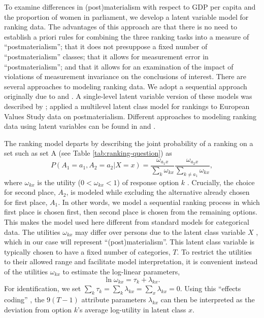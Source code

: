 \documentclass[letterpaper,12pt]{article}
\begin{document}
To examine differences in (post)materialism with respect to GDP per capita and the proportion of women in parliament, we develop a latent variable model for ranking data. The advantages of this approach are that there is no need to establish a priori rules for combining the three ranking tasks into a measure of ``postmaterialism''; that it does not presuppose a fixed number of ``postmaterialism'' classes; that it allows for measurement error in ``postmaterialism''; and that it allows for an examination of the impact of violations of measurement invariance on the conclusions of interest. 
There are several approaches to modeling ranking data. We adopt a sequential approach originally due to \citet{luce1959individual} and \citet{mcfadden1974conditional}. A single-level latent variable  version of these models was described by \citet{bockenholt2002comparison}; \citet{moors2007heterogeneity} applied a multilevel latent class model for rankings to European Values Study data on postmaterialism. Different approaches to modeling ranking data using latent variables can be found in
\citet{maydeu2005structural} and \citet{brown2011item,brown2012fitting}. 

The ranking model departs by describing the joint probability of a ranking on a set such as set A (see Table \ref{tab:ranking-question}) as 
\begin{equation}
	P(A_1 = a_1, A_2 = a_2 | X = x) = 
		\frac{\omega_{a_1 x}}{\sum_{k} \omega_{k x}}
		\frac{\omega_{a_2 x}}{\sum_{k \neq a_1}
			\omega_{k x}},
				\label{eq:ranking}
\end{equation}
where $\omega_{k x}$ is the utility ($0<\omega_{k x}<1$) of response option $k$ \citep{mcfadden1974conditional}. Crucially, the choice for second place, $A_2$, is modeled while excluding the alternative already chosen for first place, $A_1$. In other words, we model a sequential ranking process in which first place is chosen first, then second place is chosen from the remaining options.
This makes the model used here different from standard models for categorical data.
 The utilities $\omega_{kx}$ may differ over persons due to the latent class variable $X$ \citep[pp. 171--3]{bockenholt2002comparison}, which in our case will represent ``(post)materialism''. This latent class variable is typically chosen to have a fixed number of categories, $T$. To restrict the utilities to their allowed range and facilitate model interpretation, it is convenient instead of the utilities $\omega_{kx}$ to estimate the log-linear parameters,
\begin{equation}
	\ln \omega_{k x} = \tau_{k} + \lambda_{k x}.\label{eq:loglin-measurement}
\end{equation}
For identification, we set $\sum_k \tau_{k} = \sum_{k} \lambda_{kx} = \sum_{x} \lambda_{kx} = 0$. Using this ``effects coding''  \citep{vermunt2013technical},  the $9 (T - 1)$ attribute parameters $\lambda_{k x}$ can then be interpreted as the deviation from option $k$'s average log-utility in latent class $x$.
\end{document}
